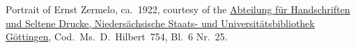 Portrait of Ernst Zermelo, ca.~1922, courtesy of
the \href{http://www.sub.uni-goettingen.de/en/contact/departments-a-z/departmental-and-unit-details/abteilunggruppe/handschriften-und-seltene-drucke/}{Abteilung
f\"ur Handschriften und Seltene Drucke, Nieders\"achsische Staats- und
Universit\"atsbibliothek G\"ottingen}, Cod.\ Ms.\ D.~Hilbert~754,
Bl.~6 Nr.~25.
